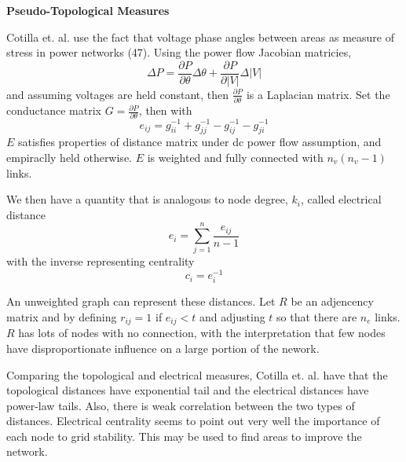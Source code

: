 \textbf{Pseudo-Topological Measures}

Cotilla et. al. \cite{cotilla_2012} use the fact that voltage phase angles between areas as measure of stress in power networks (47).  Using the power flow Jacobian matricies,
\begin{equation}
 \Delta P = \frac{ \partial P }{ \partial \theta} \Delta \theta + \frac{ \partial P }{ \partial | V | } \Delta | V |
\end{equation}
and assuming voltages are held constant, then $\frac{ \partial P }{ \partial \theta} $ is a Laplacian matrix.
Set the conductance matrix $G = \frac{ \partial P }{ \partial \theta}$, then with
\begin{equation}
e_{ij} = g_{ii}^{-1} + g_{jj}^{-1} - g_{ij}^{-1} - g_{ji}^{-1}
\end{equation}
$E$ satisfies properties of distance matrix under dc power flow assumption, and empiraclly held otherwise.  $E$ is weighted and fully connected with $n_v(n_v-1)$ links.

We then have a quantity that is analogous to node degree, $k_i$, called electrical distance
\begin{equation}
e_i = \sum_{j=1}^n \frac{e_{ij}}{n-1}
\end{equation}
with the inverse representing centrality
\begin{equation}
c_i = e_i^{-1}
\end{equation}

An unweighted graph can represent these distances.  Let $R$ be an adjencency matrix and by defining $r_{ij} = 1 $ if $e_{ij} < t$ and adjusting $t$ so that there are  $n_e$ links.  $R$ has lots of nodes with no connection, with the interpretation that few nodes have disproportionate influence on a large portion of the nework.

Comparing the topological and electrical measures, Cotilla et. al. \cite{cotilla_2012} have that the topological distances have exponential tail and the electrical distances have power-law tails.  Also, there is weak correlation between the two types of distances.  Electrical centrality seems to point out very well the importance of each node to grid stability.  This may be used to find areas to improve the network.

